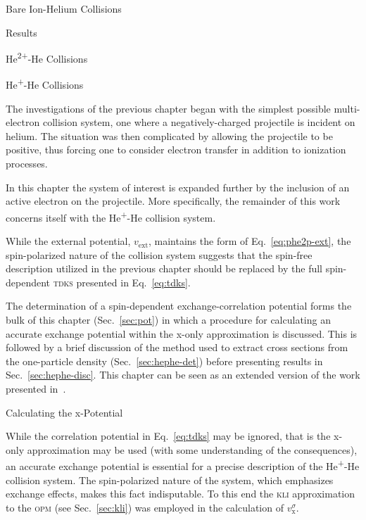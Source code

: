 \documentclass[letterpaper, 11 pt]{report}
\begin{document}
\begin{chapter}{Bare Ion-Helium Collisions \label{chap:p-he2p-he}}
\begin{section}{Results \label{sec:phe2p-res}}
\begin{subsection}{\texorpdfstring{He\textsuperscript{2+}}{He2+}-He Collisions
                         \label{sec:he2phe-res}}
      \end{subsection}

   \end{section}

\end{chapter}

\begin{chapter}{\texorpdfstring{He\textsuperscript{+}}{He+}-He Collisions \label{chap:hephe}}

   The investigations of the previous chapter began with the simplest possible multi-electron collision
   system, one where a negatively-charged projectile is incident on helium. The situation was then
   complicated by allowing the projectile to be positive, thus forcing one to consider electron transfer
   in addition to ionization processes.

   In this chapter the system of interest is expanded further by the inclusion of an active electron on
   the projectile. More specifically, the remainder of this work concerns itself with the
   He\textsuperscript{+}-He collision system.

   While the external potential, $v_\mathrm{ext}$, maintains the form of Eq.~\eqref{eq:phe2p-ext}, the
   spin-polarized nature of the collision system suggests that the spin-free description utilized in the
   previous chapter should be replaced by the full spin-dependent \textsc{tdks} presented in
   Eq.~\eqref{eq:tdks}.

   The determination of a spin-dependent exchange-correlation potential forms the bulk of this chapter
   (Sec.~\ref{sec:pot}) in which a procedure for calculating an accurate exchange potential within the
   x-only approximation is discussed. This is followed by a brief discussion of the method used to
   extract cross sections from the one-particle density (Sec.~\ref{sec:hephe-det}) before presenting
   results in Sec.~\ref{sec:hephe-disc}. This chapter can be seen as an extended version of the work
   presented in~\cite{hephe}.

   \begin{section}{Calculating the x-Potential \label{sec:pot}}

      While the correlation potential in Eq.~\eqref{eq:tdks} may be ignored, that is the x-only
      approximation may be used (with some understanding of the consequences), an accurate exchange
      potential is essential for a precise description of the He\textsuperscript{+}-He collision
      system. The spin-polarized nature of the system, which emphasizes exchange effects, makes this
      fact indisputable. To this end the \textsc{kli} approximation to the \textsc{opm}
      (see Sec.~\ref{sec:kli}) was employed in the calculation of $v^\sigma_\mathrm{x}$.


\end{section}
\end{chapter}
\end{document}
